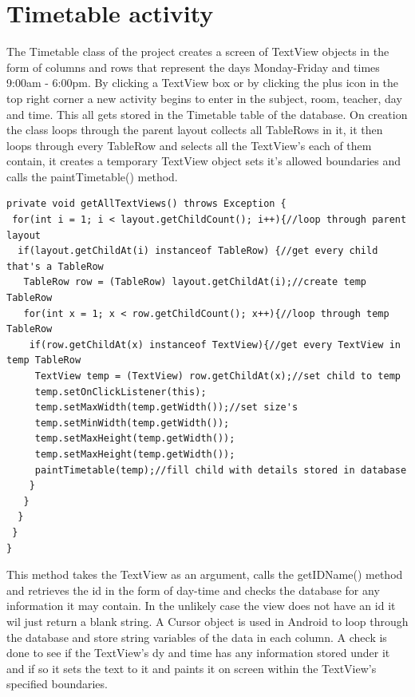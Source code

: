 \section{Timetable activity}
The Timetable class of the project creates a screen of TextView objects in the form of columns and rows that represent the days Monday-Friday and times 9:00am - 6:00pm. By clicking a TextView box or by clicking the plus icon in the top right corner a new activity begins to enter in the subject, room, teacher, day and time. This all gets stored in the Timetable table of the database. On creation the class loops through the parent layout collects all TableRows in it, it then loops through every TableRow and selects all the TextView's each of them contain, it creates a temporary TextView object sets it's allowed boundaries and calls the paintTimetable() method.

\begin{verbatim}
private void getAllTextViews() throws Exception {
 for(int i = 1; i < layout.getChildCount(); i++){//loop through parent layout
  if(layout.getChildAt(i) instanceof TableRow) {//get every child that's a TableRow
   TableRow row = (TableRow) layout.getChildAt(i);//create temp TableRow
   for(int x = 1; x < row.getChildCount(); x++){//loop through temp TableRow
    if(row.getChildAt(x) instanceof TextView){//get every TextView in temp TableRow
	 TextView temp = (TextView) row.getChildAt(x);//set child to temp
	 temp.setOnClickListener(this);
	 temp.setMaxWidth(temp.getWidth());//set size's
	 temp.setMinWidth(temp.getWidth());		
	 temp.setMaxHeight(temp.getWidth());
	 temp.setMaxHeight(temp.getWidth());		
	 paintTimetable(temp);//fill child with details stored in database
    }
   }
  }
 }
}
\end{verbatim}

This method takes the TextView as an argument, calls the getIDName() method and retrieves the id in the form of day-time and checks the database for any information it may contain. In the unlikely case the view does not have an id it wil just return a blank string. A Cursor object is used in Android to loop through the database and store string variables of the data in each column. A check is done to see if the TextView's dy and time has any information stored under it and if so it sets the text to it and paints it on screen within the TextView's specified boundaries.
\pagebreak


